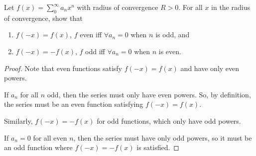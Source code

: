 \documentclass[../hw3]{subfiles}
\begin{document}
\begin{problem}
Let $f(x)=\sum_{0}^{\infty} a_n x^n$ with radius of convergence $R>0$.
For all $x$ in the radius of convergence, show that
\begin{enumerate}[label=\roman*)]
	\item $f(-x)=f(x)$, $f$ even iff $\forall a_n = 0$ when $n$ is odd, and
	\item $f(-x)=-f(x)$,  $f$ odd iff  $\forall a_n = 0$ when $n$ is even.
\end{enumerate}
\end{problem}
\begin{proof}
	Note that even functions satisfy $f(-x)=f(x)$ and have only even powers.

	If $a_n$ for all  $n$ odd, then the series must only have even powers.
	So, by definition, the series must be an even function satisfying $f(-x)=f(x)$.

	Similarly,  $f(-x)=-f(x)$ for odd functions, which only have odd powers.

	If  $a_n=0$ for all even  $n$, then the series must have only odd powers, so it must be an odd function where $f(-x)=-f(x)$ is satisfied.
\end{proof}
\end{document}
